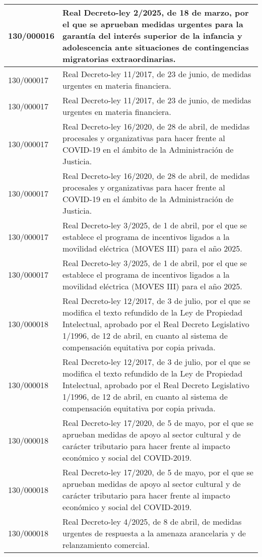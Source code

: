 {\begin{table}[H]
\begin{center}
\begin{tabularx}{\linewidth}{| l | X |}
\hline
130/000016 & Real Decreto-ley 2/2025, de 18 de marzo, por el que se aprueban medidas urgentes para la garantía del interés superior de la infancia y adolescencia ante situaciones de contingencias migratorias extraordinarias. \\
\hline
130/000017 & Real Decreto-ley 11/2017, de 23 de junio, de medidas urgentes en materia financiera. \\
\hline
130/000017 & Real Decreto-ley 11/2017, de 23 de junio, de medidas urgentes en materia financiera. \\
\hline
130/000017 & Real Decreto-ley 16/2020, de 28 de abril, de medidas procesales y organizativas para hacer frente al COVID-19 en el ámbito de la Administración de Justicia. \\
\hline
130/000017 & Real Decreto-ley 16/2020, de 28 de abril, de medidas procesales y organizativas para hacer frente al COVID-19 en el ámbito de la Administración de Justicia. \\
\hline
130/000017 & Real Decreto-ley 3/2025, de 1 de abril, por el que se establece el programa de incentivos ligados a la movilidad eléctrica (MOVES III) para el año 2025. \\
\hline
130/000017 & Real Decreto-ley 3/2025, de 1 de abril, por el que se establece el programa de incentivos ligados a la movilidad eléctrica (MOVES III) para el año 2025. \\
\hline
130/000018 & Real Decreto-ley 12/2017, de 3 de julio, por el que se modifica el texto refundido de la Ley de Propiedad Intelectual, aprobado por el Real Decreto Legislativo 1/1996, de 12 de abril, en cuanto al sistema de compensación equitativa por copia privada. \\
\hline
130/000018 & Real Decreto-ley 12/2017, de 3 de julio, por el que se modifica el texto refundido de la Ley de Propiedad Intelectual, aprobado por el Real Decreto Legislativo 1/1996, de 12 de abril, en cuanto al sistema de compensación equitativa por copia privada. \\
\hline
130/000018 & Real Decreto-ley 17/2020, de 5 de mayo, por el que se aprueban medidas de apoyo al sector cultural y de carácter tributario para hacer frente al impacto económico y social del COVID-2019. \\
\hline
130/000018 & Real Decreto-ley 17/2020, de 5 de mayo, por el que se aprueban medidas de apoyo al sector cultural y de carácter tributario para hacer frente al impacto económico y social del COVID-2019. \\
\hline
130/000018 & Real Decreto-ley 4/2025, de 8 de abril, de medidas urgentes de respuesta a la amenaza arancelaria y de relanzamiento comercial. \\

\end{tabularx}
\end{center}
\end{table}}
